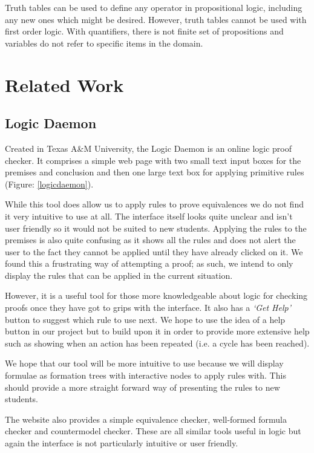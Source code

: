 \documentclass{report}
\begin{document}
Truth tables can be used to define any operator in propositional logic, including any new ones which might be desired. However, truth tables cannot be used with first order logic. With quantifiers, there is not finite set of propositions and variables do not refer to specific items in the domain.

\chapter{Related Work}
\label{chap:related_work}

\section{Logic Daemon}

Created in Texas A\&M University, the Logic Daemon\cite{logicdaemon} is an online logic proof checker. It comprises a simple web page with two small text input boxes for the premises and conclusion and then one large text box for applying primitive rules (Figure: \ref{logicdaemon}).

While this tool does allow us to apply rules to prove equivalences we do not find it very intuitive to use at all. The interface itself looks quite unclear and isn't user friendly so it would not be suited to new students. Applying the rules to the premises is also quite confusing as it shows all the rules and does not alert the user to the fact they cannot be applied until they have already clicked on it. We found this a frustrating way of attempting a proof; as such, we intend to only display the rules that can be applied in the current situation.

However, it is a useful tool for those more knowledgeable about logic for checking proofs once they have got to grips with the interface. It also has a \textit{`Get Help'} button to suggest which rule to use next. We hope to use the idea of a help button in our project but to build upon it in order to provide more extensive help such as showing when an action has been repeated (i.e. a cycle has been reached).

We hope that our tool will be more intuitive to use because we will display formulae as formation trees with interactive nodes to apply rules with. This should provide a more straight forward way of presenting the rules to new students.

The website also provides a simple equivalence checker, well-formed formula checker and countermodel checker. These are all similar tools useful in logic but again the interface is not particularly intuitive or user friendly.
\end{document}
